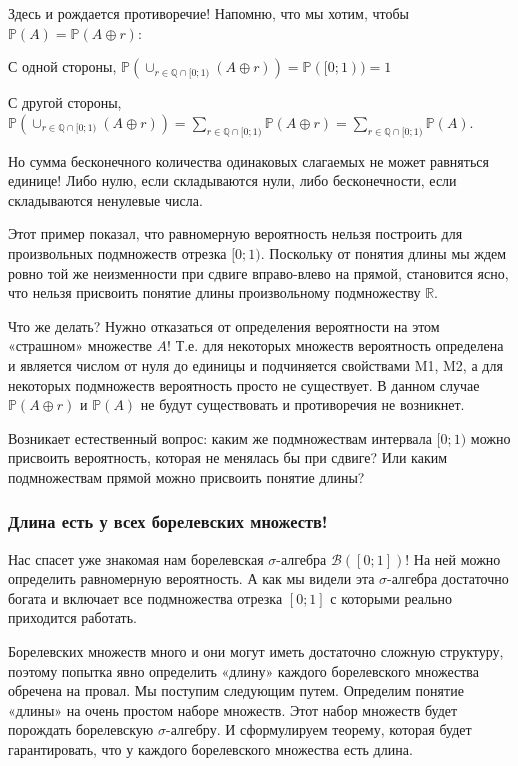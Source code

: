 \documentclass[pdftex, 12pt, a4paper]{article}
\def \mbb{\mathbb}
\def \PP{\mbb{P}}
\def\R{\ensuremath{\mathbb{R}}} %
\def\s{\ensuremath{\sigma}}
\theoremstyle{definition} %
\numberwithin{problem}{section}
\numberwithin{blits}{section}
\begin{document}
Здесь и рождается противоречие! Напомню, что мы хотим, чтобы $\PP(A)=\PP(A\oplus r)$:

С одной стороны,  $\PP(\cup_{r\in\mathbb{Q}\cap [0;1)} (A\oplus r))=\PP([0;1))=1$

С другой стороны, $\PP(\cup_{r\in\mathbb{Q}\cap [0;1)} (A\oplus r))=\sum_{r\in\mathbb{Q}\cap [0;1)} \PP(A\oplus r)=\sum_{r\in\mathbb{Q}\cap [0;1)} \PP(A)$.

Но сумма бесконечного количества одинаковых слагаемых не может равняться единице! Либо нулю, если складываются нули, либо бесконечности, если складываются ненулевые числа.

Этот пример показал, что равномерную вероятность нельзя построить для произвольных подмножеств отрезка $[0;1)$. Поскольку от понятия длины мы ждем ровно той же неизменности при сдвиге вправо-влево на прямой, становится ясно, что нельзя присвоить понятие длины произвольному подмножеству \R.

Что же делать? Нужно отказаться от определения вероятности на этом «страшном» множестве $A$! Т.е. для некоторых множеств вероятность определена и является числом от нуля до единицы и подчиняется свойствами M1, M2, а для некоторых подмножеств вероятность просто не существует. В данном случае $\PP(A\oplus r)$ и $\PP(A)$ не будут существовать и противоречия не возникнет.

Возникает естественный вопрос: каким же подмножествам интервала $[0;1)$ можно присвоить вероятность, которая не менялась бы при сдвиге? Или каким подмножествам прямой можно присвоить понятие длины?

\subsubsection*{Длина есть у всех борелевских множеств!}

Нас спасет уже знакомая нам борелевская $\sigma$-алгебра $\mathcal{B}([0;1])$! На ней можно определить равномерную вероятность. А как мы видели эта $\sigma$-алгебра достаточно богата и включает все подмножества отрезка $[0;1]$ с которыми реально приходится работать.

Борелевских множеств много и они могут иметь достаточно сложную структуру, поэтому попытка явно определить «длину» каждого борелевского множества обречена на провал. Мы поступим следующим путем. Определим понятие «длины» на очень простом наборе множеств. Этот набор множеств будет порождать борелевскую \s-алгебру. И сформулируем теорему, которая будет гарантировать, что у каждого борелевского множества есть длина.
\end{document}
